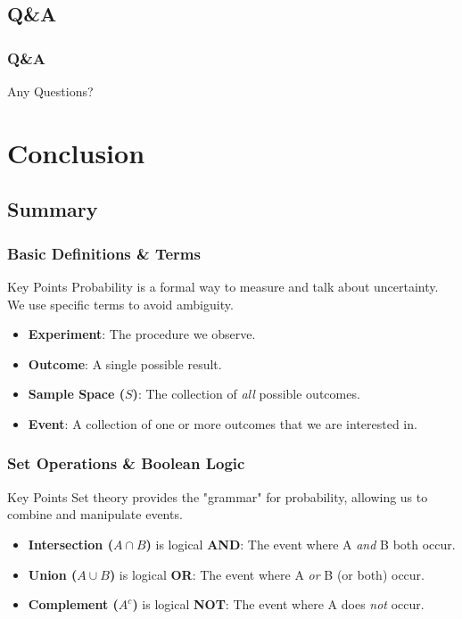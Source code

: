 \subsection{Q\&A}
\begin{frame}
\frametitle{Q\&A}
\vspace{-5mm}
    \begin{center}
        \Huge Any Questions?
    \end{center}
\end{frame}

\section{Conclusion}
\subsection{Summary}
\begin{frame}[t]
\frametitle{Basic Definitions \& Terms}
    \begin{block}{Key Points}
        Probability is a formal way to measure and talk about uncertainty. We use specific terms to avoid ambiguity.
        \begin{itemize}
            \item \textbf{Experiment}: The procedure we observe.
            \item \textbf{Outcome}: A single possible result.
            \item \textbf{Sample Space ($S$)}: The collection of \textit{all} possible outcomes.
            \item \textbf{Event}: A collection of one or more outcomes that we are interested in.
        \end{itemize}
    \end{block}
\end{frame}

\begin{frame}[t]
\frametitle{Set Operations \& Boolean Logic}
    \begin{block}{Key Points}
        Set theory provides the "grammar" for probability, allowing us to combine and manipulate events.
        \begin{itemize}
            \item \textbf{Intersection ($A \cap B$)} is logical \textbf{AND}: The event where A \textit{and} B both occur.
            \item \textbf{Union ($A \cup B$)} is logical \textbf{OR}: The event where A \textit{or} B (or both) occur.
            \item \textbf{Complement ($A^c$)} is logical \textbf{NOT}: The event where A does \textit{not} occur.
        \end{itemize}
    \end{block}
\end{frame}

